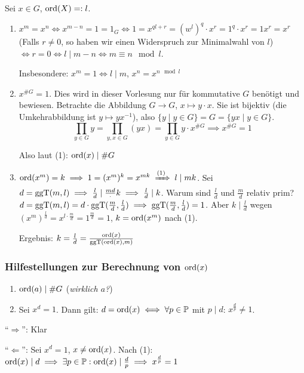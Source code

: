\documentclass[a4paper,twoside,DIV15,BCOR12mm]{scrbook}
\begin{document}
\begin{beweis}[Elementordnungssatz]
Sei $x\in G$, $\mathop{\rm ord}\nolimits(X) =: l$.
\begin{enumerate}
\item $x^m = x^n \iff x^{m-n}= 1 = 1_G \iff 1= x^{ql+r} = (w^l)^q\cdot x^r = 1^q\cdot x^r = 1x^r = x^r$ (Falls $r\ne0$, so haben wir einen Widerspruch zur Minimalwahl von $l$) $\iff r=0 \iff l\mid m-n \iff m \equiv n \mod l$.

Insbesondere: $x^m=1 \iff l \mid m$, $x^n = x^{n\mod l}$
\item $x^{\#G} = 1$. Dies wird in dieser Vorlesung nur für kommutative $G$ benötigt und bewiesen. Betrachte die Abbildung $G\to G$, $x \mapsto y\cdot x$. Sie ist bijektiv (die Umkehrabbildung ist $y\mapsto y x^{-1}$), also $\{y \mid y\in G\} = G = \{yx \mid y\in G\}$.
\[ \prod_{y\in G}y  =\prod_{y,x\in G} (yx) = \prod_{y\in G} y \cdot x^{\#G} \implies x^{\#G} = 1 \]

Also laut (1): $\mathop{\rm ord}\nolimits(x) \mid \#G$

\item $\ord(x^m)=k \implies 1= (x^m)^k = x^{mk} \folgtnach{(1)} l \mid mk$. Sei $d=\mathop{\rm ggT}\nolimits(m,l) \implies \frac{l}{d} \mid \frac{m d} \cdot k \implies \frac l d \mid k$. Warum sind $\frac l d$ und $\frac md$ relativ prim? $d = \mathop{\rm ggT}\nolimits(m,l)= d\cdot \mathop{\rm ggT}\nolimits(\frac m d, \frac l d) \implies \mathop{\rm ggT}\nolimits(\frac m d, \frac l d) = 1$. Aber $k \mid \frac l d$ wegen $(x^m)^{\frac l d} = x^{l\cdot \frac md} = 1^{\frac m d} = 1$, $k= \mathop{\rm ord}\nolimits(x^m)$ nach (1).

Ergebnis: $k = \frac l d = \frac {\mathop{\rm ord}\nolimits(x)} {\mathop{\rm ggT}\nolimits(\mathop{\rm ord}\nolimits(x),m)}$

\end{enumerate}
\end{beweis}

\subsubsection*{Hilfestellungen zur Berechnung von $\mathop{\rm ord}\nolimits(x)$}

\begin{bemerkungen}
\begin{enumerate}
\item $\mathop{\rm ord}\nolimits(a)\mid\#G$ (\emph{wirklich $a$?})
\item Sei $x^d=1$. Dann gilt: $d = \mathop{\rm ord}\nolimits(x) \iff \forall p\in\mathbb{P}$ mit $p\mid d$: $x^{\frac dp} \ne 1$.
\end{enumerate}
\end{bemerkungen}
\begin{beweis}
"`$\Longrightarrow$"': Klar

"`$\Longleftarrow$"': Sei $x^d=1$, $x \ne \mathop{\rm ord}\nolimits(x)$. Nach (1):
$\mathop{\rm ord}\nolimits(x)\mid d \implies \exists p\in\mathbb{P}: \mathop{\rm ord}\nolimits(x) \mid \frac dp
\implies x^{\frac d p } = 1$
\end{beweis}
\end{document}
